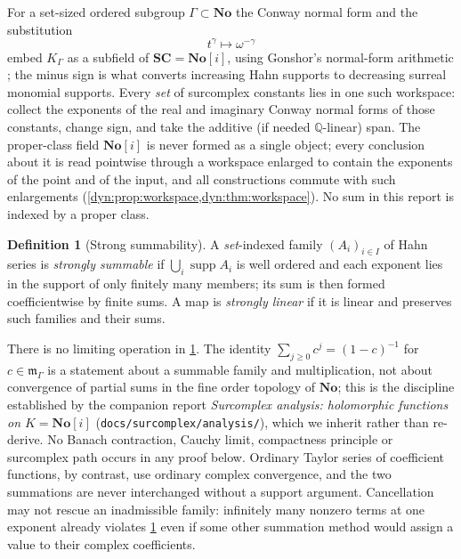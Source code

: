\documentclass[11pt,letterpaper]{article}
\theoremstyle{definition}
\newtheorem{definition}[definition]{Definition}
\theoremstyle{remark}
\newcommand{\Q}{\mathbb Q}
\newcommand{\No}{\mathbf{No}}
\newcommand{\SC}{\mathbf{SC}}
\newcommand{\m}{\mathfrak m}
\newcommand{\supp}{\operatorname{supp}}
\numberwithin{equation}{section}
\begin{document}
For a set-sized ordered subgroup $\Gamma\subset\No$ the Conway normal form
and the substitution
\begin{equation}\label{dyn:eq:embedding}
 t^{\gamma}\longmapsto\omega^{-\gamma}
\end{equation}
embed $K_\Gamma$ as a subfield of $\SC=\No[i]$, using Gonshor's normal-form
arithmetic \cite{Gonshor}; the minus sign is what converts increasing Hahn
supports to decreasing surreal monomial supports. Every \emph{set} of
surcomplex constants lies in one such workspace: collect the exponents of
the real and imaginary Conway normal forms of those constants, change sign,
and take the additive (if needed $\Q$-linear) span. The proper-class field
$\No[i]$ is never formed as a single object; every conclusion about it is
read pointwise through a workspace enlarged to contain the exponents of the
point and of the input, and all constructions commute with such
enlargements (\cref{dyn:prop:workspace,dyn:thm:workspace}). No sum in this
report is indexed by a proper class.

\begin{definition}[Strong summability]\label{dyn:def:summable}
A \emph{set}-indexed family $(A_i)_{i\in I}$ of Hahn series is
\emph{strongly summable} if $\bigcup_i\supp A_i$ is well ordered and each
exponent lies in the support of only finitely many members; its sum is then
formed coefficientwise by finite sums. A map is \emph{strongly linear} if
it is linear and preserves such families and their sums.
\end{definition}

There is no limiting operation in \cref{dyn:def:summable}. The identity
$\sum_{j\ge0}c^{j}=(1-c)^{-1}$ for $c\in\m_\Gamma$ is a statement about a
summable family and multiplication, not about convergence of partial sums
in the fine order topology of $\No$; this is the discipline established by
the companion report \emph{Surcomplex analysis: holomorphic functions on
$K=\No[i]$} (\texttt{docs/surcomplex/analysis/}), which we inherit rather
than re-derive. No Banach contraction, Cauchy limit, compactness principle
or surcomplex path occurs in any proof below. Ordinary Taylor series of
coefficient functions, by contrast, use ordinary complex convergence, and
the two summations are never interchanged without a support argument.
Cancellation may not rescue an inadmissible family: infinitely many nonzero
terms at one exponent already violates \cref{dyn:def:summable} even if some
other summation method would assign a value to their complex coefficients.
\end{document}
